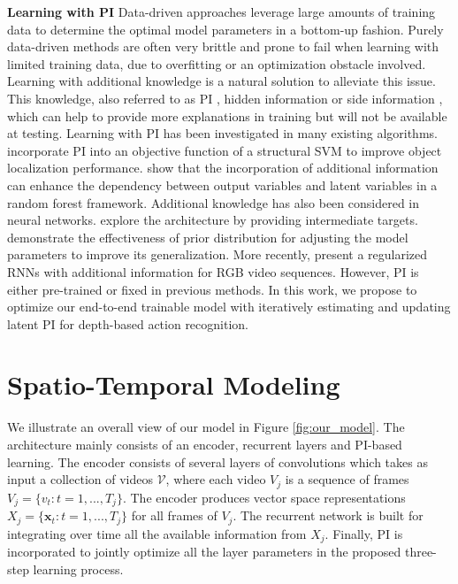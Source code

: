 \documentclass[10pt,twocolumn,letterpaper]{article}
\begin{document}
\vspace{0.2cm}
\noindent \textbf{Learning with PI} Data-driven approaches leverage large amounts of training data to determine the optimal model parameters in a bottom-up fashion. Purely data-driven methods are often very brittle and prone to fail when learning with limited training data, due to overfitting or an optimization obstacle involved. Learning with additional knowledge is a natural solution to alleviate this issue. This knowledge, also referred to as PI \cite{Vapnik2009544}, hidden information \cite{Wang_2015_CVPR} or side information \cite{Xu_nips_2013}, which can help to provide more explanations in training but will not be available at testing. Learning with PI has been investigated in many existing algorithms. \cite{Feyereisl_2014_nips} incorporate PI into an objective function of a structural SVM to improve object localization performance. \cite{dantone_2012_cvpr} show that the incorporation of additional information can enhance the dependency between output variables and latent variables in a random forest framework. Additional knowledge has also been considered in neural networks. \cite{JMLR_gulchere16a} explore the architecture by providing intermediate targets. \cite{eslami_air_2016} demonstrate the effectiveness of prior distribution for adjusting the model parameters to improve its generalization. More recently, \cite{Mahasseni_2016_CVPR} present a regularized RNNs with additional information for RGB video sequences. However, PI is either pre-trained or fixed in previous methods. In this work, we propose to optimize our end-to-end trainable model with iteratively estimating and updating latent PI for depth-based action recognition.

\section{Spatio-Temporal Modeling}

We illustrate an overall view of our model in Figure \ref{fig:our_model}. The architecture mainly consists of an encoder, recurrent layers and PI-based learning. The encoder consists of several layers of convolutions which takes as input a collection of videos $\mathcal{V}$, where each video $V_j$ is a sequence of frames  $V_j=\{v_t : t=1,...,T_j\}$. The encoder produces vector space representations $X_j=\{\bm{x}_t : t=1,...,T_j\}$ for all frames of $V_j$. The recurrent network is built for integrating over time all the available information from $X_j$. Finally, PI is incorporated to jointly optimize all the layer parameters in the proposed three-step learning process.
\end{document}

